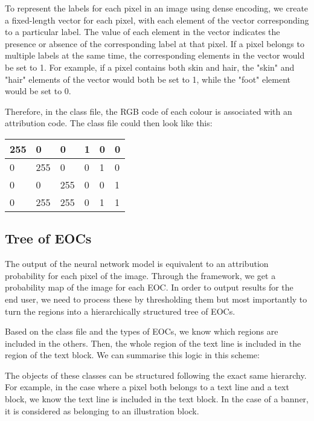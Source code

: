 \documentclass{polytech/polytech}
\numberwithin{figure}{chapter}
\begin{document}
To represent the labels for each pixel in an image using dense encoding, we create a fixed-length vector for each pixel, with each element of the vector corresponding to a particular label.
The value of each element in the vector indicates the presence or absence of the corresponding label at that pixel.
If a pixel belongs to multiple labels at the same time, the corresponding elements in the vector would be set to 1.
For example, if a pixel contains both skin and hair, the "skin" and "hair" elements of the vector would both be set to 1, while the "foot" element would be set to 0.

Therefore, in the class file, the RGB code of each colour is associated with an attribution code.
The class file could then look like this:
\begin{table}[]
\begin{tabular}{|llllll|}\hline
255 & 0 & 0 & 1 & 0 & 0\\\hline
0 & 255 & 0 & 0 & 1 & 0 \\\hline
0 & 0  & 255 & 0 & 0 & 1 \\\hline
0 & 255  &255 & 0 & 1 & 1 \\\hline
\end{tabular}
\end{table}


\subsection{Tree of EOCs}

The output of the neural network model is equivalent to an attribution probability for each pixel of the image.
Through the framework, we get a probability map of the image for each EOC.
In order to output results for the end user, we need to process these by thresholding them but most importantly to turn the regions into a hierarchically structured tree of EOCs.

Based on the class file and the types of EOCs, we know which regions are included in the others.
Then, the whole region of the text line is included in the region of the text block.
We can summarise this logic in this scheme:

\label{EOCdiag}

The objects of these classes can be structured following the exact same hierarchy.
For example, in the case where a pixel both belongs to a text line and a text block, we know the text line is included in the text block. In the case of a banner, it is considered as belonging to an illustration block.
\end{document}
